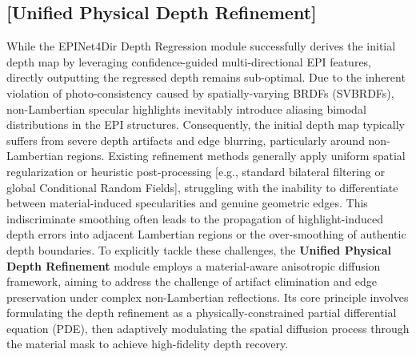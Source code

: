\documentclass[lettersize,journal]{IEEEtran}
\begin{document}
\subsection{ [Unified Physical Depth Refinement]}

While the EPINet4Dir Depth Regression module successfully derives the initial depth map by leveraging confidence-guided multi-directional EPI features, directly outputting the regressed depth remains sub-optimal. Due to the inherent violation of photo-consistency caused by spatially-varying BRDFs (SVBRDFs), non-Lambertian specular highlights inevitably introduce aliasing bimodal distributions in the EPI structures. Consequently, the initial depth map typically suffers from severe depth artifacts and edge blurring, particularly around non-Lambertian regions. Existing refinement methods generally apply uniform spatial regularization or heuristic post-processing  [e.g., standard bilateral filtering or global Conditional Random Fields], struggling with the inability to differentiate between material-induced specularities and genuine geometric edges. This indiscriminate smoothing often leads to the propagation of highlight-induced depth errors into adjacent Lambertian regions or the over-smoothing of authentic depth boundaries. To explicitly tackle these challenges, the \textbf{Unified Physical Depth Refinement} module employs a material-aware anisotropic diffusion framework, aiming to address the challenge of artifact elimination and edge preservation under complex non-Lambertian reflections. Its core principle involves formulating the depth refinement as a physically-constrained partial differential equation (PDE), then adaptively modulating the spatial diffusion process through the material mask to achieve high-fidelity depth recovery.
\end{document}
